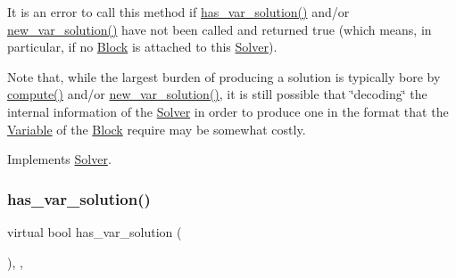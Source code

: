It is an error to call this method if \mbox{\hyperlink{class_s_m_spp__di__unipi__it_1_1_fake_solver_ade6d8078e2b6708ea0fa989629de2419}{has\+\_\+var\+\_\+solution()}} and/or \mbox{\hyperlink{class_s_m_spp__di__unipi__it_1_1_solver_af109b504a566c90a4ea45c1574c128fe}{new\+\_\+var\+\_\+solution()}} have not been called and returned true (which means, in particular, if no \mbox{\hyperlink{class_s_m_spp__di__unipi__it_1_1_block}{Block}} is attached to this \mbox{\hyperlink{class_s_m_spp__di__unipi__it_1_1_solver}{Solver}}).

Note that, while the largest burden of producing a solution is typically bore by \mbox{\hyperlink{class_s_m_spp__di__unipi__it_1_1_fake_solver_afc8ff54ab05d22f4cca0fb0bfbeb7a49}{compute()}} and/or \mbox{\hyperlink{class_s_m_spp__di__unipi__it_1_1_solver_af109b504a566c90a4ea45c1574c128fe}{new\+\_\+var\+\_\+solution()}}, it is still possible that \char`\"{}decoding\char`\"{} the internal information of the \mbox{\hyperlink{class_s_m_spp__di__unipi__it_1_1_solver}{Solver}} in order to produce one in the format that the \mbox{\hyperlink{class_s_m_spp__di__unipi__it_1_1_variable}{Variable}} of the \mbox{\hyperlink{class_s_m_spp__di__unipi__it_1_1_block}{Block}} require may be somewhat costly. 

Implements \mbox{\hyperlink{class_s_m_spp__di__unipi__it_1_1_solver_a91d7cd0dc4fa453406ef30db2bfa37a5}{Solver}}.

\mbox{\label{class_s_m_spp__di__unipi__it_1_1_fake_solver_ade6d8078e2b6708ea0fa989629de2419}} 
\subsubsection{\texorpdfstring{has\+\_\+var\+\_\+solution()}{has\_var\_solution()}}
{\footnotesize\ttfamily virtual bool has\+\_\+var\+\_\+solution (\begin{DoxyParamCaption}\item[{void}]{ }\end{DoxyParamCaption})\hspace{0.3cm}{\ttfamily [inline]}, {\ttfamily [override]}, {\ttfamily [virtual]}}



